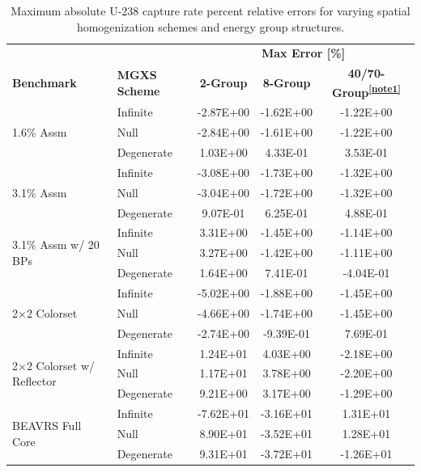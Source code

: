 \begin{table}[h!]
  \centering
  \caption[Maximum OpenMOC U-238 capture rate errors]{Maximum absolute U-238 capture rate percent relative errors for varying spatial homogenization schemes and energy group structures.}
  \small
  \label{table:chap8-openmoc-max-capt-rates}
  \vspace{6pt}
  \begin{tabular}{l l c c c}
  \toprule
  \rowcolor{lightgray}
  & & \multicolumn{3}{c}{\cellcolor{lightgray} \textbf{Max Error [\%]}} \\
  \multirow{-2}{*}{\cellcolor{lightgray} \bf Benchmark} &
  \multirow{-2}{*}{\cellcolor{lightgray} \bf \ac{MGXS} Scheme} &
  \multicolumn{1}{c}{{\cellcolor{lightgray} \bf 2-Group}} &
  \multicolumn{1}{c}{{\cellcolor{lightgray} \bf 8-Group}} &
  \multicolumn{1}{c}{{\cellcolor{lightgray} \bf 40/70-Group\textsuperscript{\ref{note1}}}} \\
  \midrule
\multirow{3}{*}{\parbox{2.5cm}{1.6\% Assm}} & Infinite & -2.87E+00 & -1.62E+00 & -1.22E+00 \\
& Null & -2.84E+00 & -1.61E+00 & -1.22E+00 \\
& Degenerate & 1.03E+00 & 4.33E-01 & 3.53E-01 \\
  \midrule
\multirow{3}{*}{\parbox{2.5cm}{3.1\% Assm}} & Infinite & -3.08E+00 & -1.73E+00 & -1.32E+00 \\
& Null & -3.04E+00 & -1.72E+00 & -1.32E+00 \\
& Degenerate & 9.07E-01 & 6.25E-01 & 4.88E-01 \\
  \midrule
\multirow{3}{*}{\parbox{2.5cm}{3.1\% Assm w/ 20 BPs}} & Infinite & 3.31E+00 & -1.45E+00 & -1.14E+00 \\
& Null & 3.27E+00 & -1.42E+00 & -1.11E+00 \\
& Degenerate & 1.64E+00 & 7.41E-01 & -4.04E-01 \\
  \midrule
\multirow{3}{*}{\parbox{2.5cm}{2$\times$2 Colorset}} & Infinite & -5.02E+00 & -1.88E+00 & -1.45E+00 \\
& Null & -4.66E+00 & -1.74E+00 & -1.45E+00 \\
& Degenerate & -2.74E+00 & -9.39E-01 & 7.69E-01 \\
  \midrule
\multirow{3}{*}{\parbox{2.5cm}{2$\times$2 Colorset w/ Reflector}} & Infinite & 1.24E+01 & 4.03E+00 & -2.18E+00 \\
& Null & 1.17E+01 & 3.78E+00 & -2.20E+00 \\
& Degenerate & 9.21E+00 & 3.17E+00 & -1.29E+00 \\
  \midrule
\multirow{3}{*}{\parbox{2.5cm}{BEAVRS Full Core}} & Infinite & -7.62E+01 & -3.16E+01 & 1.31E+01 \\
& Null & 8.90E+01 & -3.52E+01 & 1.28E+01 \\
& Degenerate & 9.31E+01 & -3.72E+01 & -1.26E+01 \\
  \bottomrule
\end{tabular}
\end{table}

